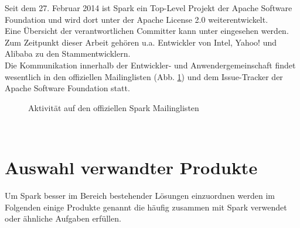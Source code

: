 Seit dem 27. Februar 2014\cite{apacheblog} ist Spark ein Top-Level Projekt der Apache Software Foundation\cite{apache} und wird dort unter der Apache License 2.0\cite{apachelic} weiterentwickelt.\\

Eine Übersicht der verantwortlichen Committer kann unter \cite{committer} eingesehen werden.
Zum Zeitpunkt dieser Arbeit gehören u.a. Entwickler von Intel, Yahoo! und Alibaba zu den Stammentwicklern.\\

Die Kommunikation innerhalb der Entwickler- und Anwendergemeinschaft findet wesentlich in den offiziellen Mailinglisten (Abb. \ref{fig:mailinglisten}) und dem Issue-Tracker\cite{issuetracker} der Apache Software Foundation statt.

\begin{figure}[ht!]
	\centering
	\caption{Aktivität auf den offiziellen Spark Mailinglisten}
	\label{fig:mailinglisten}
\end{figure}
\\

\section{Auswahl verwandter Produkte}
Um Spark besser im Bereich bestehender Lösungen einzuordnen werden im Folgenden einige Produkte genannt die häufig zusammen mit Spark verwendet oder ähnliche Aufgaben erfüllen.
